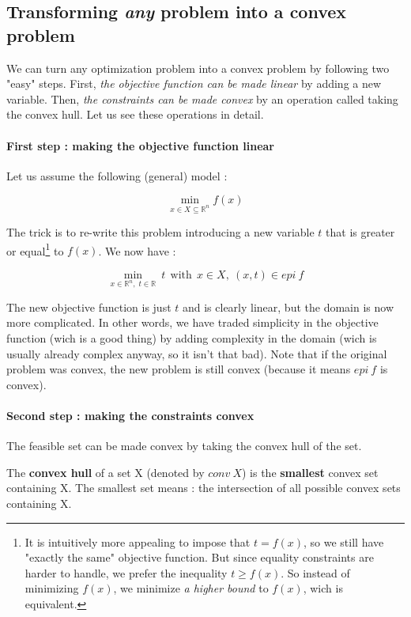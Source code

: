 \subsection{Transforming \textit{any} problem into a convex problem}
We can turn any optimization problem into a convex problem by following two "easy" steps. First, \textit{the objective function can be made linear} by adding a new variable. Then, \textit{the constraints can be made convex} by an operation called taking the convex hull. Let us see these operations in detail.

\paragraph{First step : making the objective function linear}
Let us assume the following (general) model :

$$\min_{x \in X \subseteq \mathbb{R}^n} f(x)$$

The trick is to re-write this problem introducing a new variable $t$ that is greater or equal\footnote{It is intuitively more appealing to impose that $t = f(x)$, so we still have "exactly the same" objective function. But since equality constraints are harder to handle, we prefer the inequality $t \geq f(x)$. So instead of minimizing $f(x)$, we minimize \textit{a higher bound} to $f(x)$, wich is equivalent.} to $f(x)$.  We now have :

$$\min_{x \in \mathbb{R}^n, \; t \in \mathbb{R}} \: t \: \: \mathrm{with} \: \: x \in X, \: (x,t) \in epi \: f$$

The new objective function is just $t$ and is clearly linear, but the domain is now more complicated. In other words, we have traded simplicity in the objective function (wich is a good thing) by adding complexity in the domain (wich is usually already complex anyway, so it isn't that bad). Note that if the original problem was convex, the new problem is still convex (because it means $epi \: f$ is convex).

\paragraph{Second step : making the constraints convex}
The feasible set can be made convex by taking the convex hull of the set.\\

\begin{definition}
The \textbf{convex hull} of a set X (denoted by $conv \: X$) is the \textbf{smallest} convex set containing X. The smallest set means : the intersection of all possible convex sets containing X.
\end{definition}


